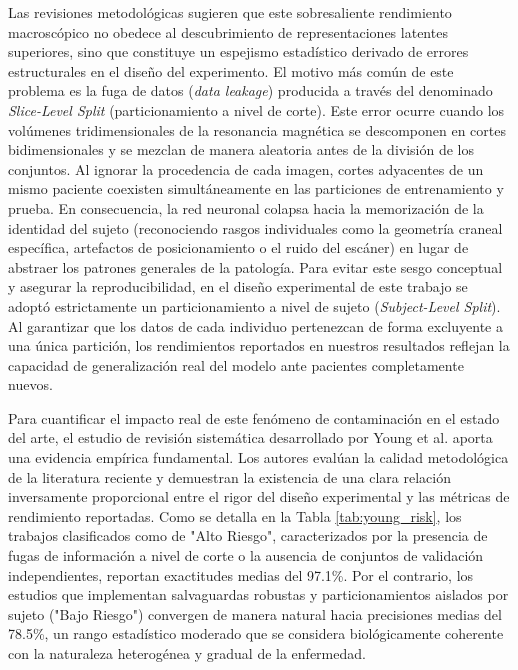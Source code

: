 \documentclass[12pt, oneside, english, spanish]{book}
\begin{document}
Las revisiones metodológicas sugieren que este sobresaliente rendimiento macroscópico no obedece al descubrimiento de representaciones latentes superiores, sino que constituye un espejismo estadístico derivado de errores estructurales en el diseño del experimento. El motivo más común de este problema es la fuga de datos (\textit{data leakage}) producida a través del denominado \textit{Slice-Level Split} \cite{yagis2021} (particionamiento a nivel de corte). Este error ocurre cuando los volúmenes tridimensionales de la resonancia magnética se descomponen en cortes bidimensionales y se mezclan de manera aleatoria antes de la división de los conjuntos. Al ignorar la procedencia de cada imagen, cortes adyacentes de un mismo paciente coexisten simultáneamente en las particiones de entrenamiento y prueba. En consecuencia, la red neuronal colapsa hacia la memorización de la identidad del sujeto (reconociendo rasgos individuales como la geometría craneal específica, artefactos de posicionamiento o el ruido del escáner) en lugar de abstraer los patrones generales de la patología. Para evitar este sesgo conceptual y asegurar la reproducibilidad, en el diseño experimental de este trabajo se adoptó estrictamente un particionamiento a nivel de sujeto (\textit{Subject-Level Split}). Al garantizar que los datos de cada individuo pertenezcan de forma excluyente a una única partición, los rendimientos reportados en nuestros resultados reflejan la capacidad de generalización real del modelo ante pacientes completamente nuevos.



Para cuantificar el impacto real de este fenómeno de contaminación en el estado del arte, el estudio de revisión sistemática desarrollado por Young et al. \cite{young2025} aporta una evidencia empírica fundamental. Los autores evalúan la calidad metodológica de la literatura reciente y demuestran la existencia de una clara relación inversamente proporcional entre el rigor del diseño experimental y las métricas de rendimiento reportadas. Como se detalla en la Tabla \ref{tab:young_risk}, los trabajos clasificados como de "Alto Riesgo", caracterizados por la presencia de fugas de información a nivel de corte o la ausencia de conjuntos de validación independientes, reportan exactitudes medias del 97.1\%. Por el contrario, los estudios que implementan salvaguardas robustas y particionamientos aislados por sujeto ("Bajo Riesgo") convergen de manera natural hacia precisiones medias del 78.5\%, un rango estadístico moderado que se considera biológicamente coherente con la naturaleza heterogénea y gradual de la enfermedad.
\end{document}
